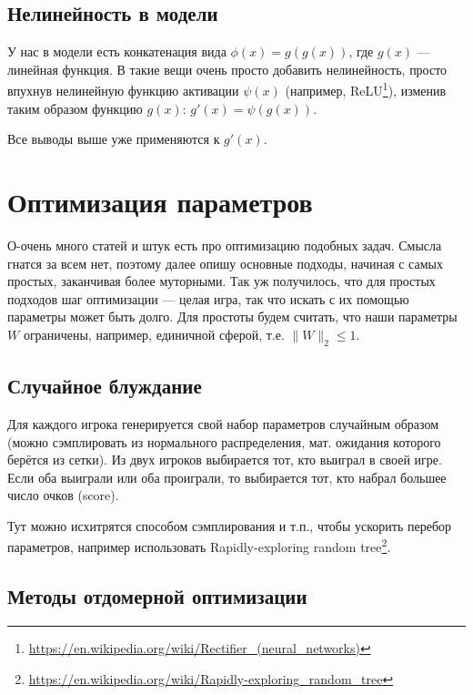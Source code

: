 \documentclass[14pt,a4paper]{article}
\begin{document}
\subsection{Нелинейность в модели}

У нас в модели есть конкатенация вида $ \phi(x) = g(g(x)) $, где $ g(x) $ --- линейная функция.
В такие вещи очень просто добавить нелинейность, просто впухнув нелинейную функцию активации $ \psi(x) $ (например, ReLU\footnote{\url{https://en.wikipedia.org/wiki/Rectifier_(neural_networks)}}), изменив таким образом функцию $ g(x) $: $ g'(x) = \psi(g(x)) $.

Все выводы выше уже применяются к $ g'(x) $.


\section{Оптимизация параметров}

О-очень много статей и штук есть про оптимизацию подобных задач.
Смысла гнатся за всем нет, поэтому далее опишу основные подходы, начиная с самых простых, заканчивая более муторными.
Так уж получилось, что для простых подходов шаг оптимизации --- целая игра, так что искать с их помощью параметры может быть долго.
Для простоты будем считать, что наши параметры $ W $ ограничены, например, единичной сферой, т.е. $ \| W \|_2 \leq 1 $.

\subsection{Случайное блуждание}

Для каждого игрока генерируется свой набор параметров случайным образом (можно сэмплировать из нормального распределения, мат. ожидания которого берётся из сетки).
Из двух игроков выбирается тот, кто выиграл в своей игре. Если оба выиграли или оба проиграли, то выбирается тот, кто набрал большее число очков (score).

Тут можно исхитрятся способом сэмплирования и т.п., чтобы ускорить перебор параметров, например использовать Rapidly-exploring random tree\footnote{\url{https://en.wikipedia.org/wiki/Rapidly-exploring_random_tree}}.

\subsection{Методы отдомерной оптимизации}
\end{document}
